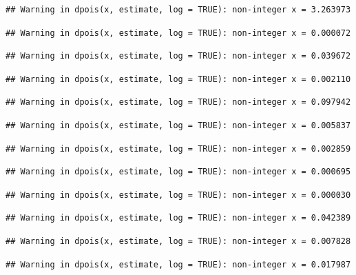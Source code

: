 \documentclass[]{article}
\begin{document}
\begin{verbatim}
## Warning in dpois(x, estimate, log = TRUE): non-integer x = 3.263973
\end{verbatim}

\begin{verbatim}
## Warning in dpois(x, estimate, log = TRUE): non-integer x = 0.000072
\end{verbatim}

\begin{verbatim}
## Warning in dpois(x, estimate, log = TRUE): non-integer x = 0.039672
\end{verbatim}

\begin{verbatim}
## Warning in dpois(x, estimate, log = TRUE): non-integer x = 0.002110
\end{verbatim}

\begin{verbatim}
## Warning in dpois(x, estimate, log = TRUE): non-integer x = 0.097942
\end{verbatim}

\begin{verbatim}
## Warning in dpois(x, estimate, log = TRUE): non-integer x = 0.005837
\end{verbatim}

\begin{verbatim}
## Warning in dpois(x, estimate, log = TRUE): non-integer x = 0.002859
\end{verbatim}

\begin{verbatim}
## Warning in dpois(x, estimate, log = TRUE): non-integer x = 0.000695
\end{verbatim}

\begin{verbatim}
## Warning in dpois(x, estimate, log = TRUE): non-integer x = 0.000030
\end{verbatim}

\begin{verbatim}
## Warning in dpois(x, estimate, log = TRUE): non-integer x = 0.042389
\end{verbatim}

\begin{verbatim}
## Warning in dpois(x, estimate, log = TRUE): non-integer x = 0.007828
\end{verbatim}

\begin{verbatim}
## Warning in dpois(x, estimate, log = TRUE): non-integer x = 0.017987
\end{verbatim}
\end{document}
